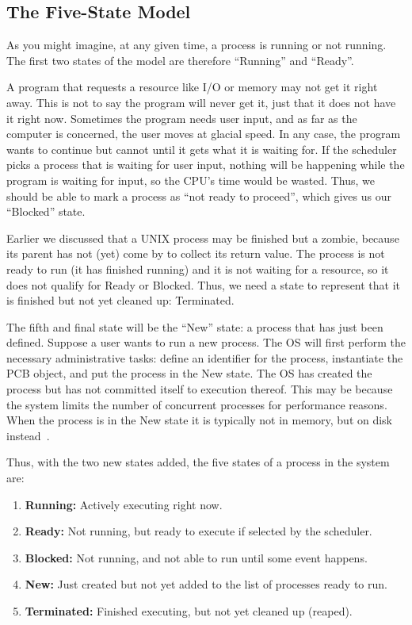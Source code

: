 \subsection*{The Five-State Model}

As you might imagine, at any given time, a process is running or not running. The first two states of the model are therefore ``Running'' and ``Ready''.

A program that requests a resource like I/O or memory may not get it right away. This is not to say the program will never get it, just that it does not have it right now. Sometimes the program needs user input, and as far as the computer is concerned, the user moves at glacial speed. In any case, the program wants to continue but cannot until it gets what it is waiting for.  If the scheduler picks a process that is waiting for user input, nothing will be happening while the program is waiting for input, so the CPU's time would be wasted. Thus, we should be able to mark a process as ``not ready to proceed'', which gives us our ``Blocked'' state.

Earlier we discussed that a UNIX process may be finished but a zombie, because its parent has not (yet) come by to collect its return value. The process is not ready to run (it has finished running) and it is not waiting for a resource, so it does not qualify for Ready or Blocked. Thus, we need a state to represent that it is finished but not yet cleaned up: Terminated.

The fifth and final state will be the ``New'' state: a process that has just been defined. Suppose a user wants to run a new process. The OS will first perform the necessary administrative tasks: define an identifier for the process, instantiate the PCB object, and put the process in the New state. The OS has created the process but has not committed itself to execution thereof. This may be because the system limits the number of concurrent processes for performance reasons. When the process is in the New state it is typically not in memory, but on disk instead~\cite{osi}.

Thus, with the two new states added, the five states of a process in the system are:

\begin{enumerate}
	\item \textbf{Running:} Actively executing right now.
	\item \textbf{Ready:} Not running, but ready to execute if selected by the scheduler.
	\item \textbf{Blocked:} Not running, and not able to run until some event happens.
	\item \textbf{New:} Just created but not yet added to the list of processes ready to run.
	\item \textbf{Terminated:} Finished executing, but not yet cleaned up (reaped).
\end{enumerate}

